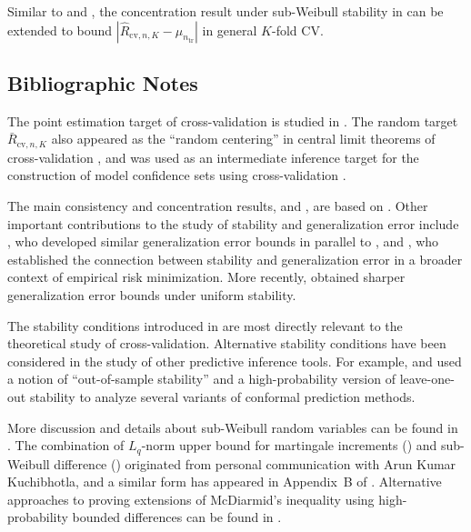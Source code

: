 \documentclass[11pt]{article}
\theoremstyle{plain}
\newcommand{\cv}{{\mathrm{cv}}}
\newcommand{\tr}{{\mathrm{tr}}}
\begin{document}
Similar to  and , the concentration result under sub-Weibull stability in  can be extended to bound $|\hat R_{\cv,n,K}-\mu_{n_\tr}|$ in general $K$-fold CV.

\subsection{Bibliographic Notes}
The point estimation target of cross-validation is studied in \cite{bates2021cross}. The random target $\bar R_{\cv,n,K}$ also appeared as the ``random centering'' in central limit theorems of cross-validation \citep{austern2020,bayle2020cross}, and was used as an intermediate inference target for the construction of model confidence sets using cross-validation \citep{lei2020cross,kissel2022high}.

The main consistency and concentration results,  and , are based on \cite{bousquet2002stability}.  Other important contributions to the study of stability and generalization error include \cite{kutin2002almost}, who developed similar generalization error bounds in parallel to \cite{bousquet2002stability}, and \cite{shalev2010learnability,wang2016learning}, who established the connection between stability and generalization error in a broader context of empirical risk minimization.  More recently, \cite{bousquet2020sharper} obtained sharper generalization error bounds under uniform stability.

The stability conditions introduced in  are most directly relevant to the theoretical study of cross-validation.  Alternative stability conditions have been considered in the study of other predictive inference tools. For example, \cite{barber2021predictive} and \cite{liang2023algorithmic} used a notion of ``out-of-sample stability'' and a high-probability version of leave-one-out stability to analyze several variants of conformal prediction methods.

More discussion and details about sub-Weibull random variables can be found in \cite{vladimirova2020sub,kuchibhotla2018moving}.  The combination of $L_q$-norm upper bound for martingale increments () and sub-Weibull difference () originated from personal communication with Arun Kumar Kuchibhotla, and a similar form has appeared in Appendix~B of \cite{kuchibhotla2023uniform}. Alternative approaches to proving extensions of McDiarmid's inequality using high-probability bounded differences can be found in \cite{kutin2002extensions,combes2024extension}.
\end{document}
